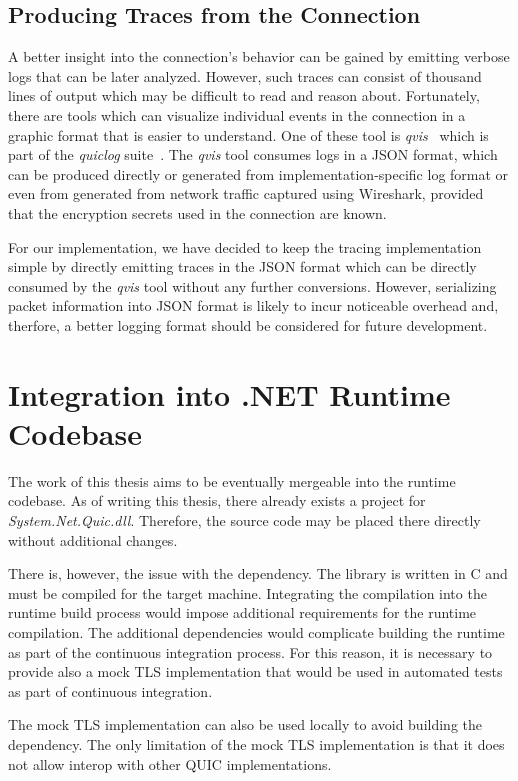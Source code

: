 \subsection{Producing Traces from the Connection}

A better insight into the connection's behavior can be gained by emitting verbose logs that can be
later analyzed. However, such traces can consist of thousand lines of output which may be difficult
to read and reason about. Fortunately, there are tools which can visualize individual events in the
connection in a graphic format that is easier to understand. One of these tool is
\textit{qvis}~\cite{web:qvis} which is part of the \textit{quiclog} suite~\cite{githubquiclog}. The
\textit{qvis} tool consumes logs in a JSON format, which can be produced directly or generated from
implementation-specific log format or even from generated from network traffic captured using
Wireshark, provided that the encryption secrets used in the connection are known.

For our implementation, we have decided to keep the tracing implementation simple by directly
emitting traces in the JSON format which can be directly consumed by the \textit{qvis} tool without
any further conversions. However, serializing packet information into JSON format is likely to incur
noticeable overhead and, therfore, a better logging format should be considered for future
development.

\section{Integration into .NET Runtime Codebase}

The work of this thesis aims to be eventually mergeable into the \dotnet{} runtime codebase. As of
writing this thesis, there already exists a project for \textit{System.Net.Quic.dll}. Therefore, the
source code may be placed there directly without additional changes.

There is, however, the issue with the \libopenssl{} dependency. The \libopenssl{} library is written
in C and must be compiled for the target machine. Integrating the \libopenssl{} compilation into the
\dotnet{} runtime build process would impose additional requirements for the \dotnet{} runtime
compilation. The additional dependencies would complicate building the \dotnet{} runtime as part of
the continuous integration process. For this reason, it is necessary to provide also a mock TLS
implementation that would be used in automated tests as part of continuous integration.

The mock TLS implementation can also be used locally to avoid building the \libopenssl{} dependency.
The only limitation of the mock TLS implementation is that it does not allow interop with other QUIC
implementations.
